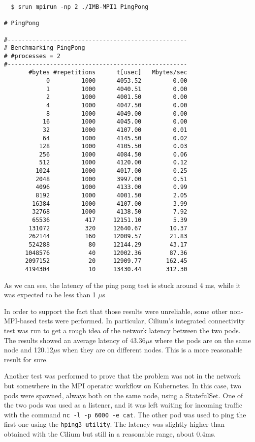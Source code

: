 \begin{verbatim}
  $ srun mpirun -np 2 ./IMB-MPI1 PingPong

# PingPong

#---------------------------------------------------
# Benchmarking PingPong
# #processes = 2
#---------------------------------------------------
       #bytes #repetitions      t[usec]   Mbytes/sec
            0         1000      4053.52         0.00
            1         1000      4040.51         0.00
            2         1000      4001.50         0.00
            4         1000      4047.50         0.00
            8         1000      4049.00         0.00
           16         1000      4045.00         0.00
           32         1000      4107.00         0.01
           64         1000      4145.50         0.02
          128         1000      4105.50         0.03
          256         1000      4084.50         0.06
          512         1000      4120.00         0.12
         1024         1000      4017.00         0.25
         2048         1000      3997.00         0.51
         4096         1000      4133.00         0.99
         8192         1000      4001.50         2.05
        16384         1000      4107.00         3.99
        32768         1000      4138.50         7.92
        65536          417     12151.10         5.39
       131072          320     12640.67        10.37
       262144          160     12009.57        21.83
       524288           80     12144.29        43.17
      1048576           40     12002.36        87.36
      2097152           20     12909.77       162.45
      4194304           10     13430.44       312.30
\end{verbatim}


As we can see, the latency of the ping pong test is stuck around 4 ms, while it
was expected to be less than 1 $\mu$s

In order to support the fact that those results were unreliable, some other
non-MPI-based tests were performed. In particular, Cilium's integrated
connectivity test was run to get a rough idea of the network latency between the
two pods. The results showed an average latency of 43.36$\mu$s where the pods
are on the same node and 120.12$\mu$s when they are on different nodes. This is
a more reasonable result for sure.

Another test was performed to prove that the problem was not in the network but
somewhere in the MPI operator workflow on Kubernetes.
In this case, two pods were spawned, always both on the same node, using a
StatefulSet. One of the two pods was used as a listener, and it was left waiting
for incoming traffic with the command \texttt{nc -l -p 6000 -e cat}.
The other pod was used to ping the first one using the \texttt{hping3 utility}.
The latency was slightly higher than obtained with the Cilium but still in a
reasonable range, about 0.4ms.


